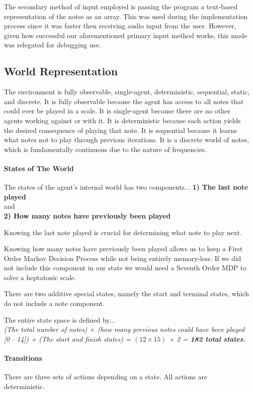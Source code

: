 \documentclass{chi2009}
\begin{document}
The secondary method of input employed is passing the program a text-based representation of the notes as an array.  This was used during the implementation process since it was faster then receiving audio input from the user.  However, given how successful our aforementioned primary input method works, this mode was relegated for debugging use.

\subsection{World Representation}
The environment is fully observable, single-agent, deterministic, sequential, static, and discrete. It is fully observable because the agent has access to all notes that could ever be played in a scale. It is single-agent because there are no other agents working against or with it. It is deterministic because each action yields the desired consequence of playing that note. It is sequential because it learns what notes not to play through previous iterations. It is a discrete world of notes, which is fundamentally continuous due to the nature of frequencies.
\paragraph{States of The World}
The states of the agent's internal world has two components... \textbf{1) The last note played} 
\\
and 
\\
\textbf{2) How many notes have previously been played} 

Knowing the last note played is crucial for determining what note to play next.

Knowing how many notes have previously been played allows us to keep a First Order Markov Decision Process while not being entirely memory-less. If we did not include this component in our state we would need a Seventh Order MDP to solve a heptatonic scale.

There are two additive special states, namely the start and terminal states, which do not include a note component.


The entire state space is defined by...\\
\textit{(The total number of notes) $\times$ (how many previous notes could have been played [0 - 14]) + (The start and finish states) = $(12 \times 15)$ + 2 = \textbf{182 total states.}}

\paragraph{Transitions}
There are three sets of actions depending on a state. All actions are deterministic.
\end{document}
